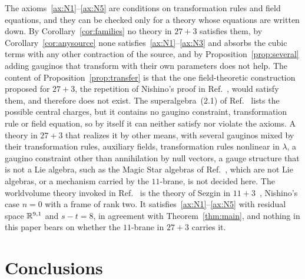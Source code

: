 \begin{remark}
\label{rem:applicability}
The axioms~\ref{ax:N1}--\ref{ax:N5} are conditions on transformation rules and field equations, and they can be checked only for a theory whose equations are written down. By Corollary~\ref{cor:families} no theory in $27+3$ satisfies them, by Corollary~\ref{cor:anysource} none satisfies~\ref{ax:N1}--\ref{ax:N3} and absorbs the cubic terms with any other contraction of the source, and by Proposition~\ref{prop:several} adding gauginos that transform with their own parameters does not help. The content of Proposition~\ref{prop:transfer} is that the one field-theoretic construction proposed for $27+3$, the repetition of Nishino's proof in Ref.~\cite[Sec.~III.A]{RiosMarraniChester2019}, would satisfy them, and therefore does not exist. The superalgebra~(2.1) of Ref.~\cite{RiosMarraniChester2020} lists the possible central charges, but it contains no gaugino constraint, transformation rule or field equation, so by itself it can neither satisfy nor violate the axioms. A theory in $27+3$ that realizes it by other means, with several gauginos mixed by their transformation rules, auxiliary fields, transformation rules nonlinear in $\lambda$, a gaugino constraint other than annihilation by null vectors, a gauge structure that is not a Lie algebra, such as the Magic Star algebras of Ref.~\cite{TruiniMarraniRiosdeGraaf2025}, which are not Lie algebras, or a mechanism carried by the $11$-brane, is not decided here. The worldvolume theory invoked in Ref.~\cite{RiosMarraniChester2020} is the theory of Sezgin in $11+3$~\cite{Sezgin1997}, Nishino's case $n=0$ with a frame of rank two. It satisfies~\ref{ax:N1}--\ref{ax:N5} with residual space $\mathbb{R}^{9,1}$ and $s-t=8$, in agreement with Theorem~\ref{thm:main}, and nothing in this paper bears on whether the $11$-brane in $27+3$ carries it.
\end{remark}

\section{Conclusions}
\label{sec:conclusions}

